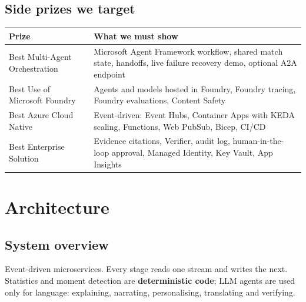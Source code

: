 \documentclass[11pt,a4paper]{article}
\newcommand{\hi}[1]{\textbf{\color{pmblue}#1}}
\begin{document}
\subsection{Side prizes we target}
\begin{tabularx}{\linewidth}{@{}l Y@{}}
\toprule
Prize & What we must show \\
\midrule
Best Multi-Agent Orchestration & Microsoft Agent Framework workflow, shared match state, handoffs, live failure recovery demo, optional A2A endpoint \\
Best Use of Microsoft Foundry  & Agents and models hosted in Foundry, Foundry tracing, Foundry evaluations, Content Safety \\
Best Azure Cloud Native        & Event-driven: Event Hubs, Container Apps with KEDA scaling, Functions, Web PubSub, Bicep, CI/CD \\
Best Enterprise Solution       & Evidence citations, Verifier, audit log, human-in-the-loop approval, Managed Identity, Key Vault, App Insights \\
\bottomrule
\end{tabularx}

\clearpage
\section{Architecture}

\subsection{System overview}
Event-driven microservices. Every stage reads one stream and writes the next. Statistics and
moment detection are \hi{deterministic code}; LLM agents are used only for language: explaining,
narrating, personalising, translating and verifying.
\end{document}

